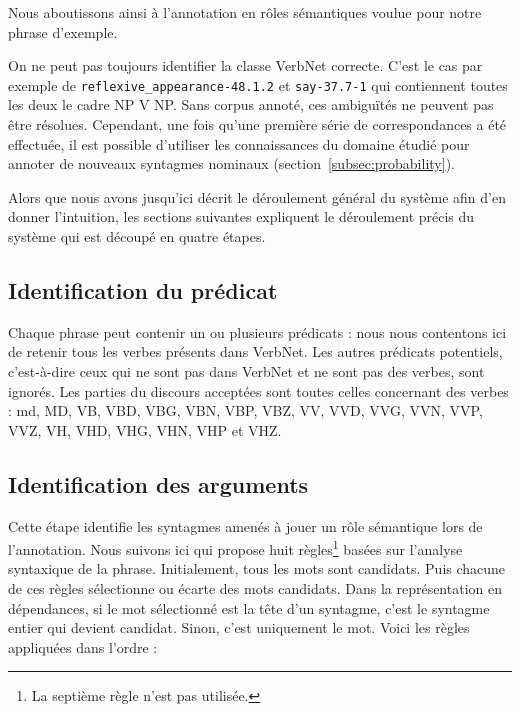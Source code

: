 Nous aboutissons ainsi à l'annotation en rôles sémantiques voulue pour notre
phrase d'exemple.

On ne peut pas toujours identifier la classe VerbNet correcte. C'est le cas par
exemple de \texttt{reflexive\_appearance-48.1.2} et \texttt{say-37.7-1} qui
contiennent toutes les deux le cadre NP V NP. Sans corpus annoté, ces
ambiguïtés ne peuvent pas être résolues.  Cependant, une fois qu'une première
série de correspondances a été effectuée, il est possible d'utiliser les
connaissances du domaine étudié pour annoter de nouveaux syntagmes nominaux
(section~\ref{subsec:probability}).

Alors que nous avons jusqu'ici décrit le déroulement général du système afin
d'en donner l'intuition, les sections suivantes expliquent le déroulement
précis du système qui est découpé en quatre étapes.

\subsection{Identification du prédicat}

Chaque phrase peut contenir un ou plusieurs prédicats : nous nous contentons
ici de retenir tous les verbes présents dans VerbNet. Les autres prédicats
potentiels, c'est-à-dire ceux qui ne sont pas dans VerbNet et ne sont pas des
verbes, sont ignorés. Les parties du discours acceptées sont toutes celles
concernant des verbes : md, MD, VB, VBD, VBG, VBN, VBP, VBZ, VV, VVD, VVG, VVN,
VVP, VVZ, VH, VHD, VHG, VHN, VHP et VHZ.

\subsection{Identification des arguments}

Cette étape identifie les syntagmes amenés à jouer un rôle sémantique lors de
l'annotation. Nous suivons ici \cite{lang2011unsupervised} qui propose huit
règles\footnote{La septième règle n'est pas utilisée.} basées sur l'analyse
syntaxique de la phrase. Initialement, tous les mots sont candidats. Puis
chacune de ces règles sélectionne ou écarte des mots candidats. Dans la
représentation en dépendances, si le mot sélectionné est la tête d'un syntagme,
c'est le syntagme entier qui devient candidat. Sinon, c'est uniquement le mot.
Voici les règles appliquées dans l'ordre :

